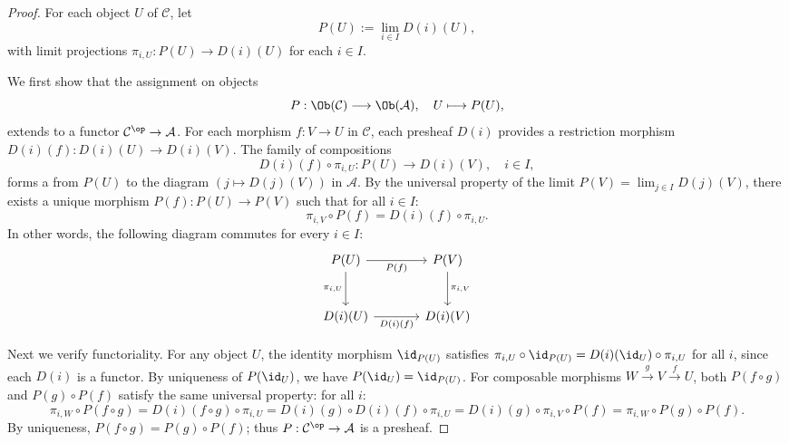 \begin{proof}
For each object $U$ of $\mathcal{C}$, let
\[
P(U) := \lim_{i \in I} D(i)(U),
\]
with limit projections $\pi_{i,U}: P(U) \to D(i)(U)$ for each $i \in I$. 


We first show that the assignment on objects
\[
P: \Ob(\mathcal{C}) \longrightarrow \Ob(\mathcal{A}), \quad U \longmapsto P(U),
\]
extends to a functor $\mathcal{C}^{\op} \to \mathcal{A}$. For each morphism $f: V \to U$ in $\mathcal{C}$, each presheaf $D(i)$ provides a restriction morphism $D(i)(f): D(i)(U) \to D(i)(V)$. The family of compositions
\[
D(i)(f) \circ \pi_{i,U}: P(U) \to D(i)(V), \quad i \in I,
\]
forms a  from $P(U)$ to the diagram $(j \mapsto D(j)(V))$ in $\mathcal{A}$. By the universal property of the limit $P(V) = \lim_{j \in I} D(j)(V)$, there exists a unique morphism $P(f): P(U) \to P(V)$ such that for all $i \in I$:
\[
\pi_{i,V} \circ P(f) = D(i)(f) \circ \pi_{i,U}.
\]
In other words, the following diagram commutes for every $i \in I$:
\[
\begin{tikzcd}[row sep=large, column sep=large]
    P(U) \arrow[r, "P(f)"'] \arrow[d, "\pi_{i,U}"'] & P(V) \arrow[d, "\pi_{i,V}"] \\
    D(i)(U) \arrow[r, "D(i)(f)"'] & D(i)(V)
\end{tikzcd}
\]

Next we verify functoriality. For any object $U$, the identity morphism $\id_{P(U)}$ satisfies $\pi_{i,U} \circ \id_{P(U)} = D(i)(\id_U) \circ \pi_{i,U}$ for all $i$, since each $D(i)$ is a functor. By uniqueness of $P(\id_U)$, we have $P(\id_U) = \id_{P(U)}$. For composable morphisms $W \xrightarrow{g} V \xrightarrow{f} U$, both $P(f \circ g)$ and $P(g) \circ P(f)$ satisfy the same universal property: for all $i$:
\[
\pi_{i,W} \circ P(f \circ g) = D(i)(f \circ g) \circ \pi_{i,U} = D(i)(g) \circ D(i)(f) \circ \pi_{i,U} = D(i)(g) \circ \pi_{i,V} \circ P(f) = \pi_{i,W} \circ P(g) \circ P(f).
\]
By uniqueness, $P(f \circ g) = P(g) \circ P(f)$; thus $P: \mathcal{C}^{\op} \to \mathcal{A}$ is a presheaf.


\end{proof}
